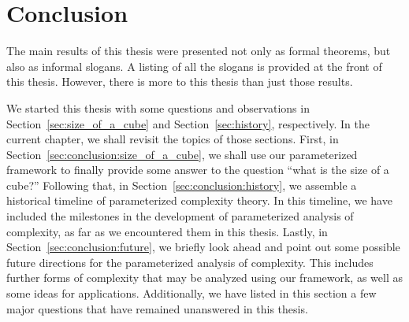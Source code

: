 \chapter{Conclusion}
\label{ch:conclusion}%

The main results of this thesis were presented not only as formal theorems, but also as informal slogans.
A listing of all the slogans is provided at the front of this thesis.
However, there is more to this thesis than just those results.

We started this thesis with some questions and observations in Section~\ref{sec:size_of_a_cube} and Section~\ref{sec:history}, respectively.
In the current chapter, we shall revisit the topics of those sections.
First, in Section~\ref{sec:conclusion:size_of_a_cube}, we shall use our parameterized framework to finally provide some answer to the question \enquote{what is the size of a cube?}
Following that, in Section~\ref{sec:conclusion:history}, we assemble a historical timeline of parameterized complexity theory.
In this timeline, we have included the milestones in the development of parameterized analysis of complexity, as far as we encountered them in this thesis.
Lastly, in Section~\ref{sec:conclusion:future}, we briefly look ahead and point out some possible future directions for the parameterized analysis of complexity.
This includes further forms of complexity that may be analyzed using our framework, as well as some ideas for applications.
Additionally, we have listed in this section a few major questions that have remained unanswered in this thesis.


\label{sec:conclusion:size_of_a_cube}%

